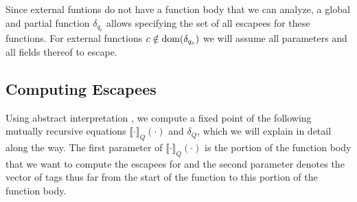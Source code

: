 Since external funtions do not have a function body that we can analyze, a global and partial function $\delta_{q_e}$ allows specifying the set of all escapees for these functions. For external functions $c \notin \mathrm{dom}(\delta_{q_e})$ we will assume all parameters and all fields thereof to escape.

\subsection{Computing Escapees}
\newcommand{\ecp}[2]{\llbracket {#1} \rrbracket_Q \left( {#2} \right)}
Using abstract interpretation \citep{cousot_abstract_1977}, we compute a fixed point of the following mutually recursive equations $\ecp{\cdot}{\cdot}$ and $\delta_Q$, which we will explain in detail along the way. The first parameter of $\ecp{\cdot}{\cdot}$ is the portion of the function body that we want to compute the escapees for and the second parameter denotes the vector of tags thus far from the start of the function to this portion of the function body.

